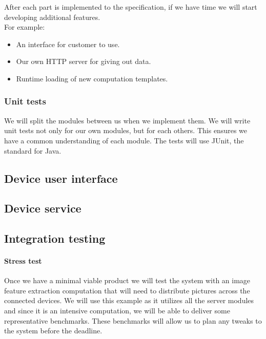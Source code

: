 \documentclass[
  twoside,
  10pt, a4paper
]{article}
\begin{document}
After each part is implemented to the specification, if we have time we will start developing additional features.\\
For example:
\begin{itemize}
\item An interface for customer to use.
\item Our own HTTP server for giving out data.
\item Runtime loading of new computation templates.
\end{itemize}

\subsubsection{Unit tests}

We will split the modules between us when we implement them. We will write unit tests not only for our own modules, but for each others.
This ensures we have a common understanding of each module. The tests will use JUnit, the standard for Java.







\subsection{Device user interface}

\subsection{Device service}

\subsection{Integration testing}
\paragraph{Stress test}

Once we have a minimal viable product we will test the system with an image feature extraction computation that will need to distribute pictures across the connected devices.
We will use this example as it utilizes all the server modules and since it is an intensive computation, we will be able to deliver some representative benchmarks.
These benchmarks will allow us to plan any tweaks to the system before the deadline.
\end{document}
